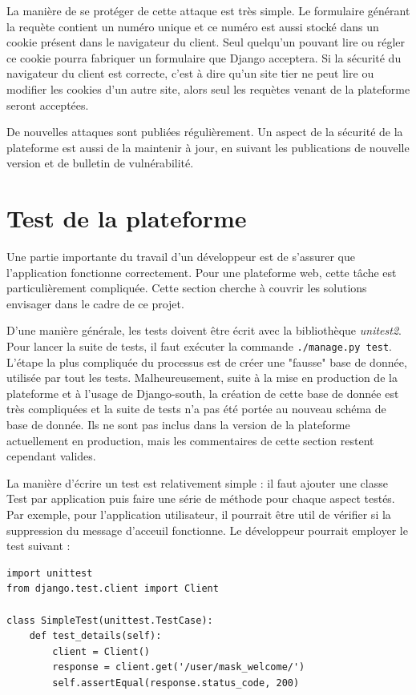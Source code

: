 \documentclass[a4paper,12pt]{article}
\begin{document}
La manière de se protéger de cette attaque est très simple. Le formulaire générant la
requète contient un numéro unique et ce numéro est aussi stocké dans un cookie présent
dans le navigateur du client. Seul quelqu'un pouvant lire ou régler ce cookie pourra
fabriquer un formulaire que Django acceptera. Si la sécurité du navigateur du client
est correcte, c'est à dire qu'un site tier ne peut lire ou modifier les cookies d'un
autre site, alors seul les requètes venant de la plateforme seront acceptées.

De nouvelles attaques sont publiées régulièrement. Un aspect de la sécurité de la plateforme
est aussi de la maintenir à jour, en suivant les publications de nouvelle version
et de bulletin de vulnérabilité.


\section{Test de la plateforme}

Une partie importante du travail d'un développeur est de s'assurer que l'application
fonctionne correctement. Pour une plateforme web, cette tâche est particulièrement
compliquée. Cette section cherche à couvrir les solutions envisager dans le cadre
de ce projet.

D'une manière générale, les tests doivent être écrit avec la bibliothèque
\textit{unitest2}. Pour lancer la suite de tests, il faut exécuter la commande
\texttt{./manage.py test}. L'étape la plus compliquée du processus est de créer
une "fausse" base de donnée, utilisée par tout les tests. Malheureusement, suite
à la mise en production de la plateforme et à l'usage de Django-south, la création de cette
base de donnée est très compliquées et la suite de tests n'a pas été portée au nouveau
schéma de base de donnée. Ils ne sont pas inclus dans la version de la plateforme
actuellement en production, mais les commentaires de cette section restent cependant
valides.

La manière d'écrire un test est relativement simple : il faut ajouter une classe
Test par application puis faire une série de méthode pour chaque aspect testés.
Par exemple, pour l'application utilisateur, il pourrait être util de vérifier
si la suppression du message d'acceuil fonctionne.
Le développeur pourrait employer le test suivant :

\begin{verbatim}
import unittest
from django.test.client import Client

class SimpleTest(unittest.TestCase):
    def test_details(self):
        client = Client()
        response = client.get('/user/mask_welcome/')
        self.assertEqual(response.status_code, 200)
\end{verbatim}
\end{document}
